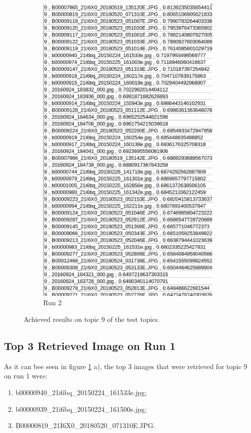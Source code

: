 \begin{figure}[H]
\begin{subfigure}{0.385\textwidth}
  \includegraphics[width=\textwidth]{Sections/7Results/images/topic9results2.png}
  \caption{Run 2}
  \end{subfigure}
  \caption{Achieved results on topic 9 of the test topics.}
  \label{fig:runs_csv}
\end{figure}
\newpage
\subsection{Top 3 Retrieved Image on Run 1}

As it can bee seen in figure \ref{fig:runs_csv} a), the top 3 images that were retrieved for topic 9 on run 1 were:
\begin{enumerate}
  \itemsep0em
  \item b00000940\_21i6bq\_20150224\_161533e.jpg;
  \item b00000939\_21i6bq\_20150224\_161500e.jpg;
  \item B00000819\_21I6X0\_20180520\_071310E.JPG.
\end{enumerate}
 
